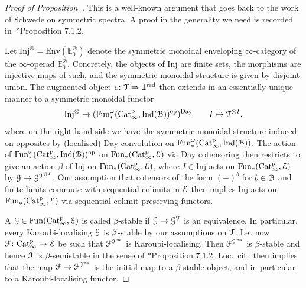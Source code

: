 \begin{proof}[Proof of Proposition~]
This is a well-known argument that goes back to the work of Schwede on symmetric spectra. A proof in the generality we need is recorded in~\cite{motives}*{Proposition 7.1.2}.

Let $\mathrm{Inj}^{\otimes} = \mathrm{Env}(\mathbb{E}_0^{\otimes})$ denote the symmetric monoidal enveloping $\infty$-category of the $\infty$-operad $\mathbb{E}_0^{\otimes}$. Concretely, the objects of $\mathrm{Inj}$ are finite sets, the morphisms are injective maps of such, and the symmetric monoidal structure is given by disjoint union. 
The augmented object $\epsilon \colon \mathcal{T} \Rightarrow \mathbf{1}^{\mathrm{red}}$ then extends in an essentially unique manner to a symmetric monoidal functor 
\[
\mathrm{Inj}^{\otimes} \to (\operatorname{Fun}^{\omega}_{\ast}(\mathrm{Cat}^{\mathrm p}_\infty,\operatorname{Ind}(\mathcal{B}))^\mathrm{op})^{\mathrm{Day}} \quad\quad I \mapsto \mathcal{T}^{\otimes I} ,
\]
where on the right hand side we have the symmetric monoidal structure induced on opposites by (localised) Day convolution on $\operatorname{Fun}^{\omega}_{\ast}(\mathrm{Cat}^{\mathrm p}_\infty,\operatorname{Ind}(\mathcal{B}))$.
The action of $\operatorname{Fun}^{\omega}_{\ast}(\mathrm{Cat}^{\mathrm p}_\infty,\operatorname{Ind}(\mathcal{B}))^\mathrm{op}$ on $\operatorname{Fun}_{\ast}(\mathrm{Cat}^{\mathrm p}_\infty,\mathcal{E})$ via Day cotensoring then restricts to give an action $\beta$ of $\mathrm{Inj}$ on $\operatorname{Fun}_{\ast}(\mathrm{Cat}^{\mathrm p}_\infty,\mathcal{E})$, where $I \in \mathrm{Inj}$ acts on $\operatorname{Fun}_{\ast}(\mathrm{Cat}^{\mathrm p}_\infty,\mathcal{E})$ by $\mathcal{G} \mapsto \mathcal{G}^{\mathcal{T}^{\otimes I}}$. 
Our assumption that cotensors of the form $(-)^b$ for $b \in \mathcal{B}$ and finite limits commute with sequential colimits in $\mathcal{E}$ then implies $\mathrm{Inj}$ acts on $\operatorname{Fun}_{\ast}(\mathrm{Cat}^{\mathrm p}_\infty,\mathcal{E})$ via sequential-colimit-preserving functors.

A $\mathcal{G} \in \operatorname{Fun}(\mathrm{Cat}^{\mathrm p}_\infty,\mathcal{E})$ is called $\beta$-stable if $\mathcal{G} \to \mathcal{G}^{\mathcal{T}}$ is an equivalence. In particular, every Karoubi-localising $\mathcal{G}$ is $\beta$-stable by our assumptions on $\mathcal{T}$.
Let now $\mathcal{F}\colon \mathrm{Cat}^{\mathrm p}_\infty \to \mathcal{E}$ be such that $\mathcal{F}^{\mathcal{T}^{\infty}}$ is Karoubi-localising. Then $\mathcal{F}^{\mathcal{T}^{\infty}}$ is $\beta$-stable and hence $\mathcal{F}$ is $\beta$-semistable in the sense of \cite{motives}*{Proposition 7.1.2}. Loc.\ cit.\ then implies that the map $\mathcal{F} \to \mathcal{F}^{\mathcal{T}^{\infty}}$ is the initial map to a $\beta$-stable object, and in particular to a Karoubi-localising functor.
\end{proof}


